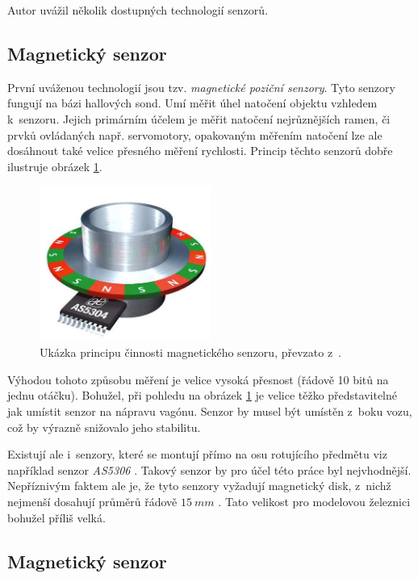 Autor uvážil několik dostupných technologií senzorů.

\subsection{Magnetický senzor}
\label{subsec:wsm-senzor-mag}

První uváženou technologií jsou tzv. \textit{magnetické poziční senzory}.
Tyto senzory fungují na bázi hallových sond. Umí měřit úhel natočení objektu
vzhledem k~senzoru. Jejich primárním účelem je měřit natočení nejrůznějších
ramen, či prvků ovládaných např. servomotory, opakovaným měřením natočení lze
ale dosáhnout také velice přesného měření rychlosti. Princip těchto senzorů
dobře ilustruje obrázek \ref{fig:magnetic-sensor}.

\begin{figure}[h]
\includegraphics[width=0.5\textwidth]{data/magnetic_sensor.png}
\caption{Ukázka principu činnosti magnetického senzoru, převzato
z~\cite{as5306}.}
\label{fig:magnetic-sensor}
\end{figure}

Výhodou tohoto způsobu měření je velice vysoká přesnost (řádově 10 bitů na
jednu otáčku). Bohužel, při pohledu na obrázek \ref{fig:magnetic-sensor} je
velice těžko představitelné jak umístit senzor na nápravu vagónu. Senzor by
musel být umístěn z~boku vozu, což by výrazně snižovalo jeho stabilitu.

Existují ale i~senzory, které se montují přímo na osu rotujícího předmětu viz
například senzor \textit{AS5306} \cite{as5306}. Takový senzor by pro účel této
práce byl nejvhodnější. Nepříznivým faktem ale je, že tyto senzory vyžadují
magnetický disk, z~nichž nejmenší dosahují průměrů řádově $15\ mm$
\cite{magnets}. Tato velikost pro modelovou železnici bohužel příliš velká.

\subsection{Magnetický senzor }
\label{subsec:wsm-senzor-cyclo}

